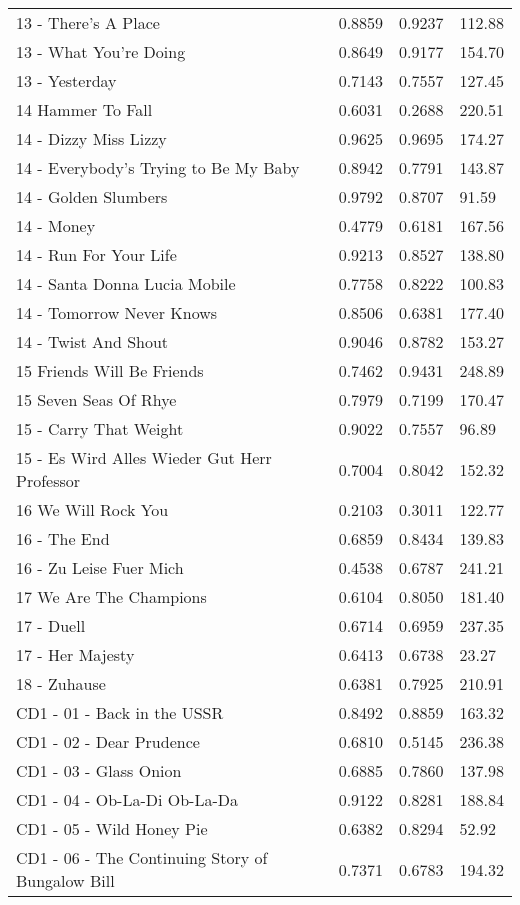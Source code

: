 \begin{longtable}[c]{|l|c|l|l|}
13 - There's A Place & 0.8859 & 0.9237 & 112.88 \\
13 - What You're Doing & 0.8649 & 0.9177 & 154.70 \\
13 - Yesterday & 0.7143 & 0.7557 & 127.45 \\
14 Hammer To Fall & 0.6031 & 0.2688 & 220.51 \\
14 - Dizzy Miss Lizzy & 0.9625 & 0.9695 & 174.27 \\
14 - Everybody's Trying to Be My Baby & 0.8942 & 0.7791 & 143.87 \\
14 - Golden Slumbers & 0.9792 & 0.8707 & 91.59 \\
14 - Money & 0.4779 & 0.6181 & 167.56 \\
14 - Run For Your Life & 0.9213 & 0.8527 & 138.80 \\
14 - Santa Donna Lucia Mobile & 0.7758 & 0.8222 & 100.83 \\
14 - Tomorrow Never Knows & 0.8506 & 0.6381 & 177.40 \\
14 - Twist And Shout & 0.9046 & 0.8782 & 153.27 \\
15 Friends Will Be Friends & 0.7462 & 0.9431 & 248.89 \\
15 Seven Seas Of Rhye & 0.7979 & 0.7199 & 170.47 \\
15 - Carry That Weight & 0.9022 & 0.7557 & 96.89 \\
15 - Es Wird Alles Wieder Gut  Herr Professor & 0.7004 & 0.8042 & 152.32 \\
16 We Will Rock You & 0.2103 & 0.3011 & 122.77 \\
16 - The End & 0.6859 & 0.8434 & 139.83 \\
16 - Zu Leise Fuer Mich & 0.4538 & 0.6787 & 241.21 \\
17 We Are The Champions & 0.6104 & 0.8050 & 181.40 \\
17 - Duell & 0.6714 & 0.6959 & 237.35 \\
17 - Her Majesty & 0.6413 & 0.6738 & 23.27 \\
18 - Zuhause & 0.6381 & 0.7925 & 210.91 \\
CD1 - 01 - Back in the USSR & 0.8492 & 0.8859 & 163.32 \\
CD1 - 02 - Dear Prudence & 0.6810 & 0.5145 & 236.38 \\
CD1 - 03 - Glass Onion & 0.6885 & 0.7860 & 137.98 \\
CD1 - 04 - Ob-La-Di  Ob-La-Da & 0.9122 & 0.8281 & 188.84 \\
CD1 - 05 - Wild Honey Pie & 0.6382 & 0.8294 & 52.92 \\
CD1 - 06 - The Continuing Story of Bungalow Bill & 0.7371 & 0.6783 & 194.32 \\

\end{longtable}
